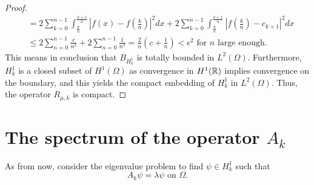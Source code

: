 \begin{theorem}
\begin{proof}
\begin{align*}
				& =  2 \sum_{k = 0}^{n-1} \int_{\frac{k}{n}}^{\frac{k+1}{n}} | f(x) - f(\frac{k}{n}) |^{2} dx +  2 \sum_{k = 0}^{n-1} \int_{\frac{k}{n}}^{\frac{k+1}{n}} | f(\frac{k}{n}) - c_{k+1} |^{2} dx \\
				& \leq 2 \sum_{n = 0}^{n-1} \frac{c}{n^{2}} + 2 \sum_{n=0}^{n-1} \frac{1}{n^{3}} = \frac{2}{n} \left( c + \frac{1}{n} \right) < \epsilon^{2} \text{ for } n \text{ large enough.}
		\end{align*}		 
	This means in conclusion that $B_{H^{1}_{k}}$ is totally bounded in $L^{2}(\Omega)$. Furthermore, $H^{1}_{k}$ is a closed subset of $H^{1}(\Omega)$ as convergence in $H^{1}(\mathbb{R})$ implies convergence on the boundary, and this yields the compact embedding of $H^{1}_{k}$ in $L^{2}(\Omega)$. Thus, the operator $R_{\mu, k}$ is compact.
	\end{proof}	
\end{theorem}		

\section{The spectrum of the operator $A_{k}$}	
As from now, consider the eigenvalue problem to find $\psi \in H^{1}_{k}$ such that
	\begin{equation}
		A_{k} \psi = \lambda \psi \text{ on } \Omega. \label{eigv-problem}
	\end{equation}
	
